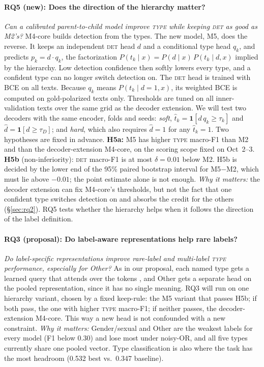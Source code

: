 \documentclass[11pt]{article}
\newcommand{\DET}{\textsc{det}}
\newcommand{\TYPE}{\textsc{type}}
\begin{document}
\paragraph{RQ5 (new): Does the direction of the hierarchy matter?}
\emph{Can a calibrated parent-to-child model improve \TYPE{} while keeping
\DET{} as good as M2's?} M4-core builds detection from the types. The new
model, M5, does the reverse. It keeps an independent \DET{} head $d$ and a
conditional type head $q_k$, and predicts $p_k = d \cdot q_k$, the
factorization $P(t_k \mid x) = P(d \mid x)\,P(t_k \mid d, x)$ implied by the
hierarchy. Low detection confidence then softly lowers every type, and a
confident type can no longer switch detection on. The \DET{} head is
trained with BCE on all texts. Because $q_k$ means $P(t_k \mid d=1, x)$, its
weighted BCE is computed on gold-polarized texts only. Thresholds are tuned
on all inner-validation texts over the same grid as the decoder extension.
We will test two decoders with the same encoder, folds and seeds:
\emph{soft}, $\hat t_k = \mathbf 1[d\,q_k \ge \tau_k]$ and
$\hat d = \mathbf 1[d \ge \tau_D]$; and \emph{hard}, which also requires
$\hat d = 1$ for any $\hat t_k = 1$. Two hypotheses are fixed in advance.
\textbf{H5a:} M5 has higher \TYPE{} macro-F1 than M2 and than the
decoder-extension M4-core, on the scoring scope fixed on Oct~2--3.
\textbf{H5b} (non-inferiority): \DET{} macro-F1 is at most $\delta=0.01$
below M2. H5b is decided by the lower end of the 95\% paired bootstrap
interval for M5$-$M2, which must lie above $-0.01$; the point estimate alone
is not enough.
\emph{Why it matters:} the decoder extension can fix M4-core's thresholds,
but not the fact that one confident type switches detection on and absorbs
the credit for the others (\S\ref{sec:rq2}). RQ5 tests whether the hierarchy
helps when it follows the direction of the label definition.

\paragraph{RQ3 (proposal): Do label-aware representations help rare labels?}
\emph{Do label-specific representations improve rare-label and multi-label
\TYPE{} performance, especially for Other?} As in our proposal, each named
type gets a learned query that attends over the tokens
\citep{mullenbach-etal-2018-explainable,nestor-etal-2026-polarizedteam}, and
Other gets a separate head on the pooled representation, since it has no
single meaning. RQ3 will run on one hierarchy variant, chosen by a fixed
keep-rule: the M5 variant that passes H5b; if both pass, the one with higher
\TYPE{} macro-F1; if neither passes, the decoder-extension M4-core. This way
a new head is not confounded with a new constraint.
\emph{Why it matters:} Gender/sexual and Other are the weakest labels for
every model (F1 below 0.30) and lose most under noisy-OR, and all five types
currently share one pooled vector. Type classification is also where the
task has the most headroom (0.532 best vs.\ 0.347 baseline).
\end{document}
